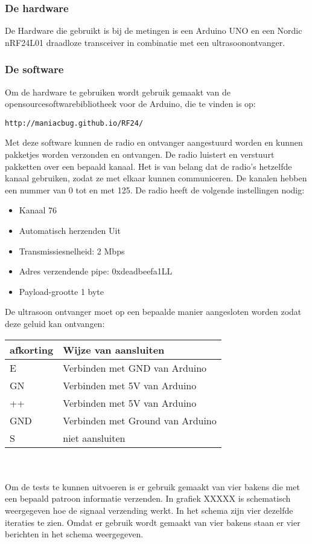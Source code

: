 \documentclass{article}
\begin{document}
\subsubsection{De hardware}
De Hardware die gebruikt is bij de metingen is een Arduino UNO en een Nordic nRF24L01 draadloze transceiver in combinatie met een ultrasoonontvanger. \\

\subsubsection{De software}
Om de hardware te gebruiken wordt gebruik gemaakt van de opensourcesoftwarebibliotheek voor de Arduino, die te vinden is op: \begin{verbatim}http://maniacbug.github.io/RF24/ \end{verbatim} 
Met deze software kunnen de radio en ontvanger aangestuurd worden en kunnen pakketjes worden verzonden en ontvangen. De radio luistert en verstuurt pakketten over een bepaald kanaal. Het is van belang dat de radio's hetzelfde kanaal gebruiken, zodat ze met elkaar kunnen communiceren. De kanalen hebben een nummer van 0 tot en met 125. De radio heeft de volgende instellingen nodig:
\begin{itemize}
	\item Kanaal 76 
	\item Automatisch herzenden Uit
	\item Transmissiesnelheid: 2 Mbps
	\item Adres verzendende pipe: 0xdeadbeefa1LL
	\item Payload-grootte 1 byte
\end{itemize}
De ultrasoon ontvanger moet op een bepaalde manier aangesloten worden zodat deze geluid kan ontvangen:
\begin{tabular}{l| l}
\hline
afkorting & Wijze van aansluiten \\ \hline
E & Verbinden met GND van Arduino \\
GN & Verbinden met 5V van Arduino \\
++ & Verbinden met 5V van Arduino \\
GND & Verbinden met Ground van Arduino \\
S & niet aansluiten \\
\end{tabular}
\\
\\
Om de tests te kunnen uitvoeren is er gebruik gemaakt van vier bakens die met een bepaald patroon informatie verzenden. In grafiek  XXXXX is schematisch weergegeven hoe de signaal verzending werkt. In het schema zijn vier dezelfde iteraties te zien. Omdat er gebruik wordt gemaakt van vier bakens staan er vier berichten in het schema weergegeven. 
\end{document}
